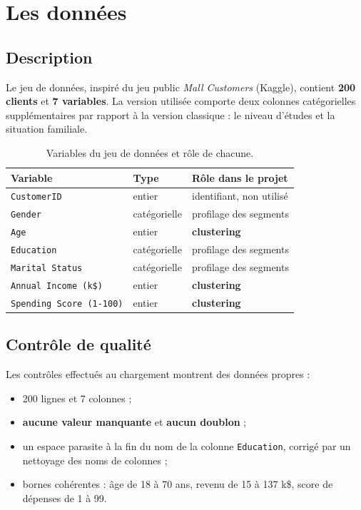 \documentclass[11pt,a4paper]{article}
\begin{document}
\section{Les données}

\subsection{Description}
Le jeu de données, inspiré du jeu public \textit{Mall Customers} (Kaggle), contient \textbf{200 clients} et \textbf{7 variables}. La version utilisée comporte deux colonnes catégorielles supplémentaires par rapport à la version classique : le niveau d'études et la situation familiale.

\begin{table}[H]
\centering
\begin{tabular}{@{}llp{6.5cm}@{}}
\toprule
\textbf{Variable} & \textbf{Type} & \textbf{Rôle dans le projet}\\
\midrule
\texttt{CustomerID} & entier & identifiant, non utilisé\\
\texttt{Gender} & catégorielle & profilage des segments\\
\texttt{Age} & entier & \textbf{clustering}\\
\texttt{Education} & catégorielle & profilage des segments\\
\texttt{Marital Status} & catégorielle & profilage des segments\\
\texttt{Annual Income (k\$)} & entier & \textbf{clustering}\\
\texttt{Spending Score (1-100)} & entier & \textbf{clustering}\\
\bottomrule
\end{tabular}
\caption{Variables du jeu de données et rôle de chacune.}
\end{table}

\subsection{Contrôle de qualité}
Les contrôles effectués au chargement montrent des données propres :
\begin{itemize}
  \item 200 lignes et 7 colonnes ;
  \item \textbf{aucune valeur manquante} et \textbf{aucun doublon} ;
  \item un espace parasite à la fin du nom de la colonne \texttt{Education}, corrigé par un nettoyage des noms de colonnes ;
  \item bornes cohérentes : âge de 18 à 70 ans, revenu de 15 à 137 k\$, score de dépenses de 1 à 99.
\end{itemize}
\end{document}
